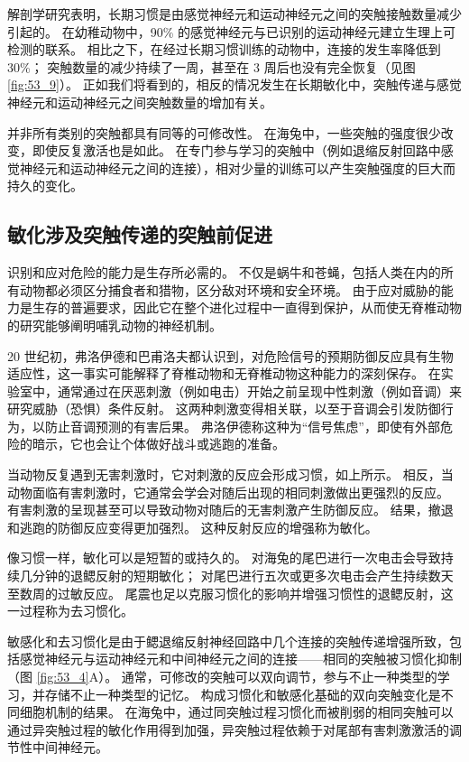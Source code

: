 解剖学研究表明，长期习惯是由感觉神经元和运动神经元之间的突触接触数量减少引起的。 在幼稚动物中，90\% 的感觉神经元与已识别的运动神经元建立生理上可检测的联系。 相比之下，在经过长期习惯训练的动物中，连接的发生率降低到 30\%； 突触数量的减少持续了一周，甚至在 3 周后也没有完全恢复（见图 \ref{fig:53_9}）。 正如我们将看到的，相反的情况发生在长期敏化中，突触传递与感觉神经元和运动神经元之间突触数量的增加有关。

并非所有类别的突触都具有同等的可修改性。 在海兔中，一些突触的强度很少改变，即使反复激活也是如此。 在专门参与学习的突触中（例如退缩反射回路中感觉神经元和运动神经元之间的连接），相对少量的训练可以产生突触强度的巨大而持久的变化。

\subsection{敏化涉及突触传递的突触前促进}
识别和应对危险的能力是生存所必需的。 不仅是蜗牛和苍蝇，包括人类在内的所有动物都必须区分捕食者和猎物，区分敌对环境和安全环境。 由于应对威胁的能力是生存的普遍要求，因此它在整个进化过程中一直得到保护，从而使无脊椎动物的研究能够阐明哺乳动物的神经机制。

20 世纪初，弗洛伊德和巴甫洛夫都认识到，对危险信号的预期防御反应具有生物适应性，这一事实可能解释了脊椎动物和无脊椎动物这种能力的深刻保存。 在实验室中，通常通过在厌恶刺激（例如电击）开始之前呈现中性刺激（例如音调）来研究威胁（恐惧）条件反射。 这两种刺激变得相关联，以至于音调会引发防御行为，以防止音调预测的有害后果。 弗洛伊德称这种为“信号焦虑”，即使有外部危险的暗示，它也会让个体做好战斗或逃跑的准备。

当动物反复遇到无害刺激时，它对刺激的反应会形成习惯，如上所示。 相反，当动物面临有害刺激时，它通常会学会对随后出现的相同刺激做出更强烈的反应。 有害刺激的呈现甚至可以导致动物对随后的无害刺激产生防御反应。 结果，撤退和逃跑的防御反应变得更加强烈。 这种反射反应的增强称为敏化。

像习惯一样，敏化可以是短暂的或持久的。 对海兔的尾巴进行一次电击会导致持续几分钟的退鳃反射的短期敏化； 对尾巴进行五次或更多次电击会产生持续数天至数周的过敏反应。 尾震也足以克服习惯化的影响并增强习惯性的退鳃反射，这一过程称为去习惯化。

敏感化和去习惯化是由于鳃退缩反射神经回路中几个连接的突触传递增强所致，包括感觉神经元与运动神经元和中间神经元之间的连接——相同的突触被习惯化抑制（图 \ref{fig:53_4}A）。 通常，可修改的突触可以双向调节，参与不止一种类型的学习，并存储不止一种类型的记忆。 构成习惯化和敏感化基础的双向突触变化是不同细胞机制的结果。 在海兔中，通过同突触过程习惯化而被削弱的相同突触可以通过异突触过程的敏化作用得到加强，异突触过程依赖于对尾部有害刺激激活的调节性中间神经元。

